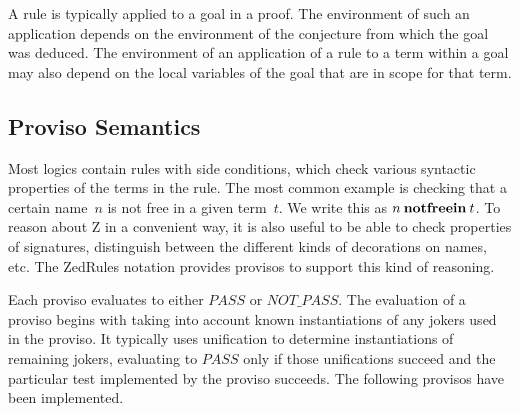 \documentclass{entcs}
\begin{document}
A rule is typically applied to a goal in a proof.
The environment of such an application
depends on the environment of the conjecture from which the goal was deduced.
The environment of an application of a rule to a term within a goal
may also depend on the local variables of the goal
that are in scope for that term.

\subsection{Proviso Semantics}

Most logics contain rules with side conditions, which check various
syntactic properties of the terms in the rule.  The most common
example is checking that a certain name~$n$ is not free in a given
term~$t$.  We write this as $n \mathbin{\mathop{\mathstrut{\mbox{\textbf{notfreein}}}}\nolimits} t$.  To reason about Z in a
convenient way, it is also useful to be able to check properties of
signatures, distinguish between the different kinds of decorations on
names, etc.
%
The ZedRules notation provides provisos to support this kind of
reasoning.

Each proviso evaluates to either $PASS$ or $NOT\_PASS$.  The
evaluation of a proviso begins with taking into account known
instantiations of any jokers used in the proviso.  It typically uses
unification to determine instantiations of remaining jokers,
evaluating to $PASS$ only if those unifications succeed and the
particular test implemented by the proviso succeeds.  The following
provisos have been implemented.
\end{document}
